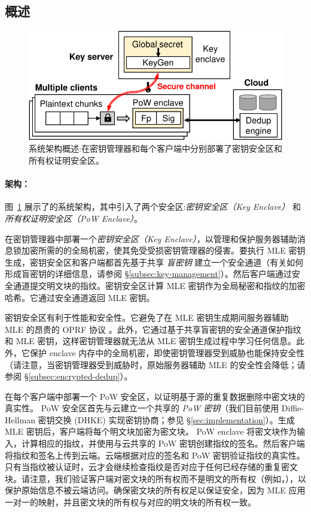 \subsection{概述}
\label{subsec:arch}

\begin{figure}[t]
\centering
\includegraphics[width=\textwidth]{pic/sgxdedup/overview.pdf}
\caption{\sysname 系统架构概述:\sysname 在密钥管理器和每个客户端中分别部署了密钥安全区和所有权证明安全区。}
\label{fig:overview}
\vspace{-3pt}
\end{figure}

\paragraph{架构：} 图~\ref{fig:overview} 展示了\sysname 的系统架构，其中引入了两个安全区:\textit{密钥安全区（Key Enclave）} 和 \textit{所有权证明安全区（PoW Enclave）}。 

\sysname 在密钥管理器中部署一个\textit{密钥安全区（Key Enclave）}，以管理和保护服务器辅助消息锁加密所需的的全局机密，使其免受受损密钥管理器的侵害。要执行 MLE 密钥生成，密钥安全区和客户端都首先基于共享 \textit{盲密钥} 建立一个安全通道（有关如何形成盲密钥的详细信息，请参阅 \S\ref{subsec:key-management}）。然后客户端通过安全通道提交明文块的指纹。密钥安全区计算 MLE 密钥作为全局秘密和指纹的加密哈希。它通过安全通道返回 MLE 密钥。

密钥安全区有利于性能和安全性。它避免了在 MLE 密钥生成期间服务器辅助 MLE 的昂贵的 OPRF 协议 \cite{bellare13b}。此外，它通过基于共享盲密钥的安全通道保护指纹和 MLE 密钥，这样密钥管理器就无法从 MLE 密钥生成过程中学习任何信息。此外，它保护 enclave 内存中的全局机密，即使密钥管理器受到威胁也能保持安全性（请注意，当密钥管理器受到威胁时，原始服务器辅助 MLE 的安全性会降低；请参阅 \S\ref{subsec:encrypted-dedup}）。

\sysname 在每个客户端中部署一个 PoW 安全区，以证明基于源的重复数据删除中密文块的真实性。 PoW 安全区首先与云建立一个共享的 \textit{ PoW 密钥}（我们目前使用 Diffie-Hellman 密钥交换 (DHKE) 实现密钥协商；参见 \S\ref{sec:implementation}）。生成 MLE 密钥后，客户端将每个明文块加密为密文块。 PoW enclave 将密文块作为输入，计算相应的指纹，并使用与云共享的 PoW 密钥创建指纹的签名。然后客户端将指纹和签名上传到云端。云端根据对应的签名和 PoW 密钥验证指纹的真实性。只有当指纹被认证时，云才会继续检查指纹是否对应于任何已经存储的重复密文块。请注意，我们验证客户端对密文块的所有权而不是明文的所有权（例如，\cite{halevi11}），以保护原始信息不被云端访问。确保密文块的所有权足以保证安全，因为 MLE 应用一对一的映射，并且密文块的所有权与对应的明文块的所有权一致。

